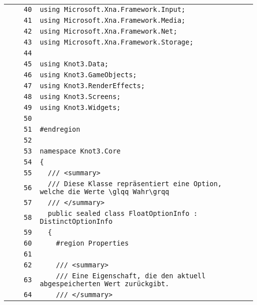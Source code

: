 \documentclass[a4paper,10pt]{article}
\begin{document}
\begin{longtable}[l]{lrrl}
\cellcolor{gray} &  & \verb~40~ & \verb~using Microsoft.Xna.Framework.Input;~\\
\cellcolor{gray} &  & \verb~41~ & \verb~using Microsoft.Xna.Framework.Media;~\\
\cellcolor{gray} &  & \verb~42~ & \verb~using Microsoft.Xna.Framework.Net;~\\
\cellcolor{gray} &  & \verb~43~ & \verb~using Microsoft.Xna.Framework.Storage;~\\
\cellcolor{gray} &  & \verb~44~ & \verb~~\\
\cellcolor{gray} &  & \verb~45~ & \verb~using Knot3.Data;~\\
\cellcolor{gray} &  & \verb~46~ & \verb~using Knot3.GameObjects;~\\
\cellcolor{gray} &  & \verb~47~ & \verb~using Knot3.RenderEffects;~\\
\cellcolor{gray} &  & \verb~48~ & \verb~using Knot3.Screens;~\\
\cellcolor{gray} &  & \verb~49~ & \verb~using Knot3.Widgets;~\\
\cellcolor{gray} &  & \verb~50~ & \verb~~\\
\cellcolor{gray} &  & \verb~51~ & \verb~#endregion~\\
\cellcolor{gray} &  & \verb~52~ & \verb~~\\
\cellcolor{gray} &  & \verb~53~ & \verb~namespace Knot3.Core~\\
\cellcolor{gray} &  & \verb~54~ & \verb~{~\\
\cellcolor{gray} &  & \verb~55~ & \verb~  /// <summary>~\\
\cellcolor{gray} &  & \verb~56~ & \verb~  /// Diese Klasse repräsentiert eine Option, welche die Werte \glqq Wahr\grqq~\\
\cellcolor{gray} &  & \verb~57~ & \verb~  /// </summary>~\\
\cellcolor{gray} &  & \verb~58~ & \verb~  public sealed class FloatOptionInfo : DistinctOptionInfo~\\
\cellcolor{gray} &  & \verb~59~ & \verb~  {~\\
\cellcolor{gray} &  & \verb~60~ & \verb~    #region Properties~\\
\cellcolor{gray} &  & \verb~61~ & \verb~~\\
\cellcolor{gray} &  & \verb~62~ & \verb~    /// <summary>~\\
\cellcolor{gray} &  & \verb~63~ & \verb~    /// Eine Eigenschaft, die den aktuell abgespeicherten Wert zurückgibt.~\\
\cellcolor{gray} &  & \verb~64~ & \verb~    /// </summary>~\\

\end{longtable}
\end{document}

